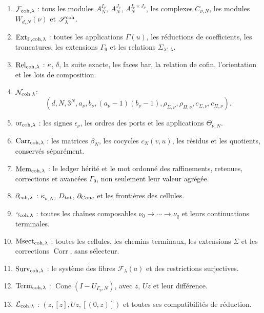 \begin{enumerate}
 \item \(\mathcal F_{{\rm coh},\lambda}\) : tous les modules
       \(A_N^{I_\nu}\), \(A_N^{J_\nu}\),
       \(A_N^{I_\nu\times J_\nu}\), les complexes \(C_{\nu,N}\), les
       modules \(W_{d,N}(\nu)\) et \(\mathscr S_\lambda^{\rm coh}\).
 \item \(\operatorname{Ext}_{\Gamma,{\rm coh},\lambda}\) : toutes les applications
       \(\Gamma(u)\), les réductions de coefficients, les troncatures, les extensions
       \(\Gamma_9\) et les relations \(\Sigma_{\lambda',\lambda}\).
 \item \(\operatorname{Rel}_{{\rm coh},\lambda}\) :
       \(\kappa\), \(\delta\), la suite exacte, les faces bar, la
       relation de cofin, l'orientation et les lois de composition.
 \item \(\mathcal N_{{\rm coh},\lambda}\):
       \[
       (d,N,3^N,a_\nu,b_\nu,(a_\nu-1)(b_\nu-1),
       \rho_{\Sigma,\nu},\rho_{\Pi,\nu},c_{\Sigma,\nu},c_{\Pi,\nu}).
       \]
 \item \(\operatorname{or}_{{\rm coh},\lambda}\) : les signes
       \(\epsilon_\nu\), les ordres des ports et les applications
       \(\Theta_{\nu,N}\).
 \item \(\operatorname{Carr}_{{\rm coh},\lambda}\) : les matrices
       \(\beta_N\), les cocycles \(c_N(v,u)\), les résidus et les quotients,
       conservés séparément.
 \item \(\operatorname{Mem}_{{\rm coh},\lambda}\) : le ledger hérité et le
       mot ordonné des raffinements, retenues, corrections et avancées
       \(\Gamma_9\), non seulement leur valeur agrégée.
 \item \(\partial_{{\rm coh},\lambda}\) :
       \(\kappa_{\nu,N}\), \(D_{\rm tot}\),
       \(\partial_{\rm Cone}\) et les frontières des cellules.
 \item \(\gamma_{{\rm coh},\lambda}\) : toutes les chaînes composables
       \(\nu_0\to\cdots\to\nu_q\) et leurs continuations terminales.
 \item \(\operatorname{Msect}_{{\rm coh},\lambda}\) : toutes les cellules,
       les chemins terminaux, les extensions \(\Sigma\) et les corrections
       \(\operatorname{Corr}\), sans sélecteur.
 \item \(\operatorname{Surv}_{{\rm coh},\lambda}\) : le système des fibres
       \(\mathscr F_\lambda(a)\) et des restrictions surjectives.
 \item \(\operatorname{Term}_{{\rm coh},\lambda}\) :
       \(\operatorname{Cone}(I-U_{\Gamma_9,N})\), avec \(z\), \(Uz\)
       et leur différence.
 \item \(\mathcal L_{{\rm coh},\lambda}\) :
       \((z,[z],Uz,[(0,z)])\) et toutes ses compatibilités de réduction.
\end{enumerate}

